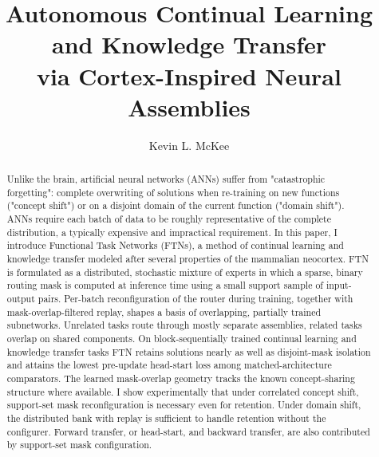 \documentclass[11pt]{article}
\title{Autonomous Continual Learning and Knowledge Transfer\\ via Cortex-Inspired Neural Assemblies}
\author[1]{Kevin L. McKee}
\affil[1]{Astera Institute}
\date{}
\begin{document}
\maketitle

\begin{abstract}
Unlike the brain, artificial neural networks (ANNs) suffer from "catastrophic forgetting": complete overwriting of solutions when re-training on new functions ("concept shift") or on a disjoint domain of the current function ("domain shift").
ANNs require each batch of data to be roughly representative of the complete distribution, a typically expensive and impractical requirement.
In this paper, I introduce Functional Task Networks (FTNs), a method of continual learning and knowledge transfer modeled after several properties of the mammalian neocortex.
FTN is formulated as a distributed, stochastic mixture of experts in which a sparse, binary routing mask is computed at inference time using a small support sample of input-output pairs.
Per-batch reconfiguration of the router during training, together with mask-overlap-filtered replay, shapes a basis of overlapping, partially trained subnetworks.
Unrelated tasks route through mostly separate assemblies, related tasks overlap on shared components. 
On block-sequentially trained continual learning and knowledge transfer tasks FTN retains solutions nearly as well as disjoint-mask isolation and attains the lowest pre-update head-start loss among matched-architecture comparators. 
The learned mask-overlap geometry tracks the known concept-sharing structure where available. 
I show experimentally that under correlated concept shift, support-set mask reconfiguration is necessary even for retention. 
Under domain shift, the distributed bank with replay is sufficient to handle retention without the configurer. 
Forward transfer, or head-start, and backward transfer, are also contributed by support-set mask configuration.
\end{abstract}

\end{document}
